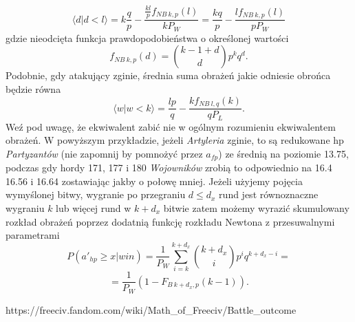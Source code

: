 \documentclass{article}
\begin{document}
\begin{equation*}
    \langle d\vert d<l \rangle = k\frac{q}{p}-\frac{\frac{kl}{p}f_{NB\:k,p}(l)}{kP_{W}} =
    \frac{kq}{p} - \frac{lf_{NB\:k,p}(l)}{pP_{W}}
\end{equation*}
gdzie nieodcięta funkcja prawdopodobieństwa o określonej wartości
\begin{equation*}
    f_{NB\: k,p}(d)= \binom{k-1+d}{d}p^{k}q^{d}
    \text{.}
\end{equation*}
Podobnie, gdy atakujący zginie, średnia suma obrażeń jakie odniesie obrońca będzie równa
\begin{equation*}
    \langle w\vert w<k \rangle = \frac{lp}{q} - 
    \frac{kf_{NB \: l,q}(k)}{qP_{L}}
    \text{.}
\end{equation*}
Weź pod uwagę, że ekwiwalent zabić nie w ogólnym rozumieniu ekwiwalentem obrażeń. W powyższym przykładzie, jeżeli \emph{Artyleria} zginie, to są redukowane hp \emph{Partyzantów} (nie zapomnij by pomnożyć przez $a_{fp}$) ze średnią na poziomie 13.75, podczas gdy hordy  171, 177 i 180  \emph{Wojowników} zrobią to odpowiednio na 16.4 16.56 i 16.64 zostawiając jakby o połowę mniej.
\newline
Jeżeli użyjemy pojęcia wymyślonej bitwy, wygranie po przegraniu $ d \leq d_{x}$ rund jest równoznaczne wygraniu $k$ lub więcej rund w $k+d_{x}$ bitwie zatem możemy wyrazić skumulowany rozkład obrażeń poprzez dodatnią  funkcję rozkładu Newtona z przesuwalnymi parametrami
\begin{equation*}
    P(a'_{hp}\geq x \vert win)=
    \frac{1}{P_{W}}\sum^{k+d_{x}}_{i=k}\binom{k+d_{x}}{i}p^{i}q^{k+d_{x}-i}=
\end{equation*}
\begin{equation}
    = \frac{1}{P_{W}} ( 1- F_{B \: k+d_{x},p}(k-1))
    \text{.}
\end{equation}
\begin{thebibliography}{99} 
https://freeciv.fandom.com/wiki/Math\_of\_Freeciv/Battle\_outcome
\end{thebibliography}
\end{document}
